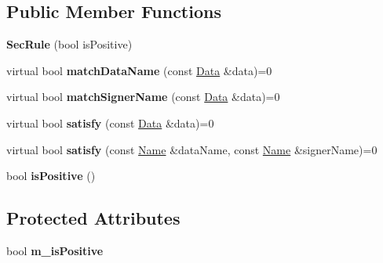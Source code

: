 \subsection*{Public Member Functions}
\begin{DoxyCompactItemize}
\item 
{\bfseries Sec\+Rule} (bool is\+Positive)\hypertarget{classndn_1_1SecRule_a9874d5589d254f04f33b82b05bb4a3bb}{}\label{classndn_1_1SecRule_a9874d5589d254f04f33b82b05bb4a3bb}

\item 
virtual bool {\bfseries match\+Data\+Name} (const \hyperlink{classndn_1_1Data}{Data} \&data)=0\hypertarget{classndn_1_1SecRule_a178d70819518c6b3b7a3a09a180d3214}{}\label{classndn_1_1SecRule_a178d70819518c6b3b7a3a09a180d3214}

\item 
virtual bool {\bfseries match\+Signer\+Name} (const \hyperlink{classndn_1_1Data}{Data} \&data)=0\hypertarget{classndn_1_1SecRule_af8c8acf5960dd8f003466da8d15c6564}{}\label{classndn_1_1SecRule_af8c8acf5960dd8f003466da8d15c6564}

\item 
virtual bool {\bfseries satisfy} (const \hyperlink{classndn_1_1Data}{Data} \&data)=0\hypertarget{classndn_1_1SecRule_a45f4ee805358ca9b417f6d934a1a3878}{}\label{classndn_1_1SecRule_a45f4ee805358ca9b417f6d934a1a3878}

\item 
virtual bool {\bfseries satisfy} (const \hyperlink{classndn_1_1Name}{Name} \&data\+Name, const \hyperlink{classndn_1_1Name}{Name} \&signer\+Name)=0\hypertarget{classndn_1_1SecRule_af9ba1e04fe3518f5d7a7075b4f065374}{}\label{classndn_1_1SecRule_af9ba1e04fe3518f5d7a7075b4f065374}

\item 
bool {\bfseries is\+Positive} ()\hypertarget{classndn_1_1SecRule_adec00120ecd9e0774fca74424249fb1c}{}\label{classndn_1_1SecRule_adec00120ecd9e0774fca74424249fb1c}

\end{DoxyCompactItemize}
\subsection*{Protected Attributes}
\begin{DoxyCompactItemize}
\item 
bool {\bfseries m\+\_\+is\+Positive}\hypertarget{classndn_1_1SecRule_ae415bcb1387941ec21ea45ab3ec4e612}{}\label{classndn_1_1SecRule_ae415bcb1387941ec21ea45ab3ec4e612}

\end{DoxyCompactItemize}



